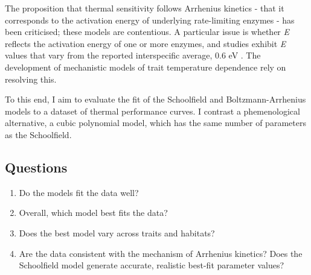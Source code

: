 \documentclass[11pt]{article}
\begin{document}
The proposition that thermal sensitivity follows Arrhenius kinetics - that it corresponds to the activation energy of underlying rate-limiting enzymes - has been criticised; these models are contentious.
A particular issue is whether \textit{E} reflects the activation energy of one or more enzymes, and studies exhibit \textit{E} values that vary from the reported interspecific average, 0.6 eV \cite{Pawar2016, Dell2011}.
The development of mechanistic models of trait temperature dependence %
rely on resolving this.

To this end, I aim to evaluate the fit of the Schoolfield and Boltzmann-Arrhenius models to a dataset of thermal performance curves. I contrast a phemenological alternative, a cubic polynomial model, which has the same number of parameters as the Schoolfield.

\subsection*{Questions}

\begin{enumerate}
	\item Do the models fit the data well?
	\item Overall, which model best fits the data?
	\item Does the best model vary across traits and habitats?
	\item Are the data consistent with the mechanism of Arrhenius kinetics? Does the Schoolfield model generate accurate, realistic best-fit parameter values?
\end{enumerate}
\end{document}
